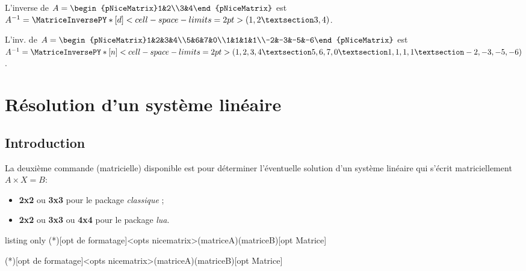 \documentclass[a4paper,11pt]{article}
\begin{document}
\begin{PresentationCode}{}
L'inverse de $A=\begin{pNiceMatrix}1&2\\3&4\end{pNiceMatrix}$ est
$A^{-1}=\MatriceInversePY*[d]<cell-space-limits=2pt>(1,2 § 3,4)$.
\end{PresentationCode}

\begin{PresentationCode}{}
L'inv. de $A=\begin{pNiceMatrix}1&2&3&4\\5&6&7&0\\1&1&1&1\\-2&-3&-5&-6\end{pNiceMatrix}$ est
$A^{-1}=
\MatriceInversePY*[n]<cell-space-limits=2pt>(1,2,3,4 § 5,6,7,0 § 1,1,1,1 § -2,-3,-5,-6)$.
\end{PresentationCode}

\section{Résolution d'un système linéaire}

\subsection{Introduction}

\begin{cautionblock}
La deuxième commande (matricielle) disponible est pour déterminer l'éventuelle solution d'un système linéaire  qui s'écrit matriciellement $A\times X=B$:

\begin{itemize}
	\item \textbf{2x2} ou \textbf{3x3} pour le package \textit{classique} ;
	\item \textbf{2x2} ou \textbf{3x3} ou \textbf{4x4} pour le package \textit{lua}.
\end{itemize}
\vspace*{-\baselineskip}\leavevmode
\end{cautionblock}

\begin{PresentationCode}{listing only}
\SolutionSysteme(*)[opt de formatage]<opts nicematrix>(matriceA)(matriceB)[opt Matrice]

\SolutionSystemePY(*)[opt de formatage]<opts nicematrix>(matriceA)(matriceB)[opt Matrice]
\end{PresentationCode}
\end{document}
